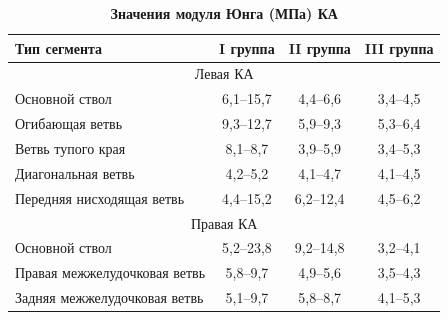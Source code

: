 \begin{table}[b!] \small \centering

\caption{\bf Значения модуля Юнга (МПа) КА}\label{gol:table:2} \vspace{-3mm}

\begin{tabular}{l|c|c|c}

\hline

\footnotesize Тип сегмента & 

\footnotesize  I группа & 

\footnotesize  I\!I группа & 

\footnotesize I\!I\!I группа \\

\hline

\multicolumn{4}{c}{\rule{0mm}{12pt}Левая КА} \\

\hline

\rule{0mm}{12pt}%

Основной ствол & 6,1--15,7 & 4,4--6,6 & 3,4--4,5\\

Огибающая ветвь  & 9,3--12,7 & 5,9--9,3 & 5,3--6,4\\

Ветвь тупого края  & 8,1--8,7 & 3,9--5,9 & 3,4--5,3\\

Диагональная ветвь  & 4,2--5,2 & 4,1--4,7 & 4,1--4,5\\ 

Передняя нисходящая ветвь  & 4,4--15,2 & 6,2--12,4 & 4,5--6,2\\

\hline

\multicolumn{4}{c}{\rule{0mm}{12pt}Правая КА} \\

\hline

\rule{0mm}{12pt}%

Основной ствол & 

5,2--23,8 & 

9,2--14,8 & 

3,2--4,1 \\

Правая межжелудочковая ветвь & 

5,8--9,7 & 

4,9--5,6 & 

3,5--4,3 \\

Задняя межжелудочковая ветвь & 

5,1--9,7 & 

5,8--8,7 & 

4,1--5,3 \\

\hline

\end{tabular}

\end{table}





